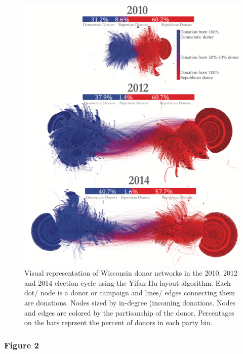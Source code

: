 \documentclass[12pt,]{article}
\begin{document}
\begin{figure}

{\centering \includegraphics[width=0.73\linewidth]{../figures/fig1} 

}

\caption{Visual representation of Wisconsin donor networks in the 2010, 2012 and 2014 election cycle using the Yifan Hu layout algorithm. Each dot/ node is a donor or campaign and lines/ edges connecting them are donations. Nodes sized by in-degree (incoming donations. Nodes and edges are colored by the partisanship of the donor. Percentages on the bars reprsent the percent of donors in each party bin.}\label{fig:unnamed-chunk-10}
\end{figure}

\newpage

\hypertarget{figure-2}{%
\subsubsection{Figure 2}\label{figure-2}}
\end{document}
